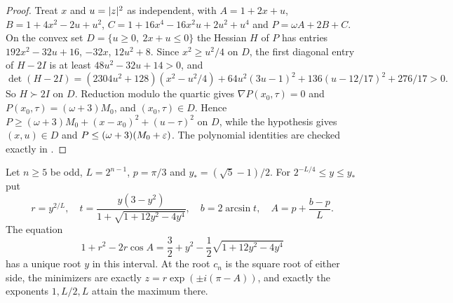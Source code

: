 \begin{proof}
Treat $x$ and $u=\lvert z\rvert^2$ as independent, with $A=1+2x+u$, $B=1+4x^2-2u+u^2$,
$C=1+16x^4-16x^2u+2u^2+u^4$ and $P=\omega A+2B+C$. On the convex set
$D=\{u\ge0,\ 2x+u\le0\}$ the Hessian $H$ of $P$ has entries $192x^2-32u+16$, $-32x$,
$12u^2+8$. Since $x^2\ge u^2/4$ on $D$, the first diagonal entry of $H-2I$ is at least
$48u^2-32u+14>0$, and
\[
 \det(H-2I)=(2304u^2+128)(x^2-u^2/4)+64u^2(3u-1)^2+136(u-12/17)^2+276/17>0 .
\]
So $H\succ2I$ on $D$. Reduction modulo the quartic gives $\nabla P(x_0,\tau)=0$ and
$P(x_0,\tau)=(\omega+3)M_0$, and $(x_0,\tau)\in D$. Hence
$P\ge(\omega+3)M_0+(x-x_0)^2+(u-\tau)^2$ on $D$, while the hypothesis gives
$(x,u)\in D$ and $P\le(\omega+3)(M_0+\varepsilon)$. The polynomial identities are checked exactly
in .
\end{proof}

\begin{theorem}\label{ana:thm:dyadicodd}
Let $n\ge5$ be odd, $L=2^{n-1}$, $p=\pi/3$ and $y_*=(\sqrt5-1)/2$. For
$2^{-L/4}\le y\le y_*$ put
\[
 r=y^{2/L},\quad t=\frac{y(3-y^2)}{1+\sqrt{1+12y^2-4y^4}},\quad b=2\arcsin t,\quad
 A=p+\frac{b-p}L .
\]
The equation
\begin{equation}\label{ana:eq:oddscalar}
 1+r^2-2r\cos A=\frac32+y^2-\frac12\sqrt{1+12y^2-4y^4}
\end{equation}
has a unique root $y$ in this interval. At the root $c_n$ is the square root of either side,
the minimizers are exactly $z=r\exp(\pm i(\pi-A))$, and exactly the exponents $1,L/2,L$
attain the maximum there.
\end{theorem}

